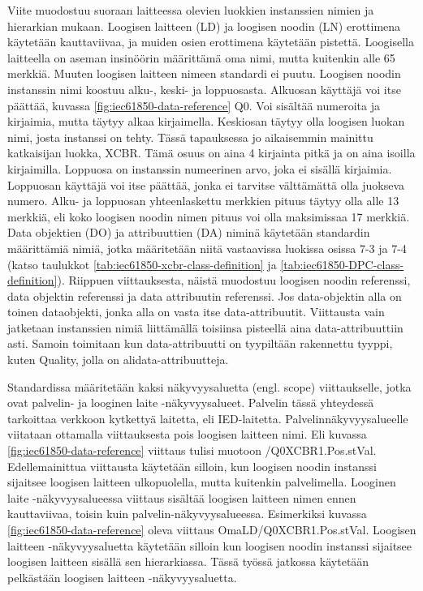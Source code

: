 Viite muodostuu suoraan laitteessa olevien luokkien instanssien nimien ja hierarkian mukaan. Loogisen laitteen (LD) ja loogisen noodin (LN) erottimena käytetään kauttaviivaa, ja muiden osien erottimena käytetään pistettä. Loogisella laitteella on aseman insinöörin määrittämä oma nimi, mutta kuitenkin alle 65 merkkiä. Muuten loogisen laitteen nimeen standardi ei puutu. Loogisen noodin instanssin nimi koostuu alku-, keski- ja loppuosasta. Alkuosan käyttäjä voi itse päättää, kuvassa \ref{fig:iec61850-data-reference} Q0. Voi sisältää numeroita ja kirjaimia, mutta täytyy alkaa kirjaimella. Keskiosan täytyy olla loogisen luokan nimi, josta instanssi on tehty. Tässä tapauksessa jo aikaisemmin mainittu katkaisijan luokka, XCBR. Tämä osuus on aina 4 kirjainta pitkä ja on aina isoilla kirjaimilla. Loppuosa on instanssin numeerinen arvo, joka ei sisällä kirjaimia. Loppuosan käyttäjä voi itse päättää, jonka ei tarvitse välttämättä olla juokseva numero. Alku- ja loppuosan yhteenlaskettu merkkien pituus täytyy olla alle 13 merkkiä, eli koko loogisen noodin nimen pituus voi olla maksimissaa 17 merkkiä. Data objektien (DO) ja attribuuttien (DA) niminä käytetään standardin määrittämiä nimiä, jotka määritetään niitä vastaavissa luokissa osissa 7-3 ja 7-4 (katso taulukkot \ref{tab:iec61850-xcbr-class-definition} ja \ref{tab:iec61850-DPC-class-definition}). Riippuen viittauksesta, näistä muodostuu loogisen noodin referenssi, data objektin referenssi ja data attribuutin referenssi. Jos data-objektin alla on toinen dataobjekti, jonka alla on vasta itse data-attribuutit. Viittausta vain jatketaan instanssien nimiä liittämällä toisiinsa pisteellä aina data-attribuuttiin asti. Samoin toimitaan kun data-attribuutti on tyypiltään rakennettu tyyppi, kuten Quality, jolla on alidata-attribuutteja. \cite[s.~181--182]{IEC61850-7-2} \cite[s.~93--95]{IEC61850-7-1}

Standardissa määritetään kaksi näkyvyysaluetta (engl. scope) viittaukselle, jotka ovat palvelin- ja looginen laite -näkyvyysalueet. Palvelin tässä yhteydessä tarkoittaa verkkoon kytkettyä laitetta, eli IED-laitetta. Palvelinnäkyvyysalueelle viitataan ottamalla viittauksesta pois loogisen laitteen nimi. Eli kuvassa \ref{fig:iec61850-data-reference} viittaus tulisi muotoon /Q0XCBR1.Pos.stVal. Edellemainittua viittausta käytetään silloin, kun loogisen noodin instanssi sijaitsee loogisen laitteen ulkopuolella, mutta kuitenkin palvelimella. Looginen laite -näkyvyysalueessa viittaus sisältää loogisen laitteen nimen ennen kauttaviivaa, toisin kuin palvelin-näkyvyysalueessa. Esimerkiksi kuvassa \ref{fig:iec61850-data-reference} oleva viittaus OmaLD/Q0XCBR1.Pos.stVal. Loogisen laitteen -näkyvyysaluetta käytetään silloin kun loogisen noodin instanssi sijaitsee loogisen laitteen sisällä sen hierarkiassa. Tässä työssä jatkossa käytetään pelkästään loogisen laitteen -näkyvyysaluetta. \cite[s.~183]{IEC61850-7-2}

